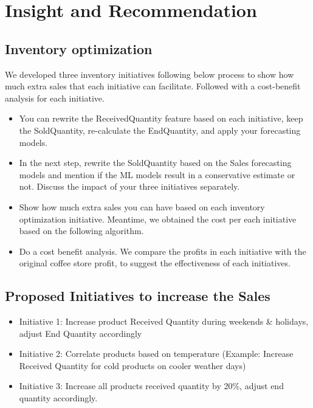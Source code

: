 \section{Insight and Recommendation}
\subsection{Inventory optimization}
We developed three inventory initiatives following below process to show how much extra sales that each initiative can facilitate. Followed with a cost-benefit analysis for each initiative.
\begin{itemize}
    \item You can rewrite the ReceivedQuantity feature based on each initiative, keep the SoldQuantity, re-calculate the EndQuantity, and apply your forecasting models.
    \item In the next step, rewrite the SoldQuantity based on the Sales forecasting models and mention if the ML models result in a conservative estimate or not. Discuss the impact of your three initiatives separately. 
    \item Show how much extra sales you can have based on each inventory optimization initiative. Meantime, we obtained the cost per each initiative based on the following algorithm.
    \item Do a cost benefit analysis. We compare the profits in each initiative with the original coffee store profit, to suggest the effectiveness of each initiatives.
\end{itemize}

\subsection{Proposed Initiatives to increase the Sales }
\begin{itemize}
    \item Initiative 1: Increase product Received Quantity during weekends & holidays, adjust End Quantity accordingly

    \item Initiative 2: Correlate products based on temperature (Example: Increase Received Quantity for cold products on cooler weather days)

    \item Initiative 3: Increase all products received quantity by 20\%, adjust end quantity accordingly.

\end{itemize}

